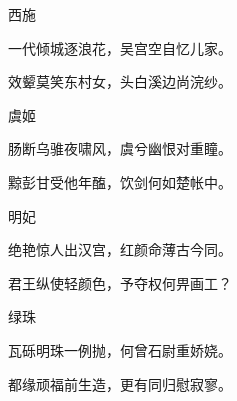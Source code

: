 \begin{poem}
    \begin{pl}
        西施
    \end{pl}


    \begin{pl}

        一代倾城逐浪花，吴宫空自忆儿家。
    \end{pl}


    \begin{pl}

        效颦莫笑东村女，头白溪边尚浣纱。
    \end{pl}
    \emptypl

    \begin{pl}


        虞姬
    \end{pl}


    \begin{pl}

        肠断乌骓夜啸风，虞兮幽恨对重瞳。
    \end{pl}


    \begin{pl}

        黥彭甘受他年醢，饮剑何如楚帐中。
    \end{pl}
    \emptypl

    \begin{pl}


        明妃
    \end{pl}


    \begin{pl}

        绝艳惊人出汉宫，红颜命薄古今同。
    \end{pl}


    \begin{pl}

        君王纵使轻颜色，予夺权何畀画工？
    \end{pl}
    \emptypl

    \begin{pl}


        绿珠
    \end{pl}


    \begin{pl}

        瓦砾明珠一例抛，何曾石尉重娇娆。
    \end{pl}


    \begin{pl}

        都缘顽福前生造，更有同归慰寂寥。
    \end{pl}
    \emptypl


\end{poem}
